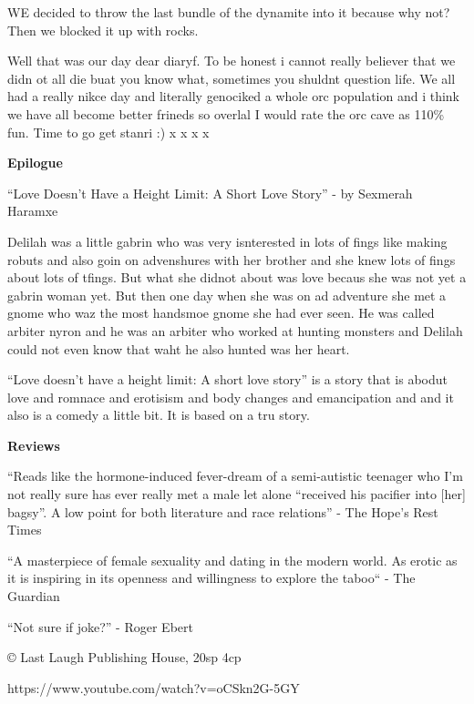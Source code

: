 WE decided to throw the last bundle of the dynamite into it because why not? Then we blocked it up with rocks.\medskip

Well that was our day dear diaryf. To be honest i cannot really believer that we didn ot all die buat you know what, sometimes you shuldnt question life. We all had a really nikce day and literally genociked a whole orc population and i think we have all become better frineds so overlal I would rate the orc cave as 110\% fun. Time to go get stanri :) x x x x\medskip

\textbf{Epilogue}\medskip

“Love Doesn’t Have a Height Limit: A Short Love Story” - by Sexmerah Haramxe\medskip

Delilah was a little gabrin who was very isnterested in lots of fings like making robuts and also goin on advenshures with her brother and she knew lots of fings about lots of tfings. But what she didnot about was love becaus she was not yet a gabrin woman yet. But then one day when she was on ad adventure she met a gnome who waz the most handsmoe gnome she had ever seen. He was called arbiter nyron and he was an arbiter who worked at hunting monsters and Delilah could not even know that waht he also hunted was her heart.\medskip

“Love doesn’t have a height limit: A short love story” is a story that is abodut love and romnace and erotisism and body changes and emancipation and and it also is a comedy a little bit. It is based on a tru story.\medskip

\textbf{Reviews}\medskip

“Reads like the hormone-induced fever-dream of a semi-autistic teenager who I’m not really sure has ever really met a male let alone “received his pacifier into [her] bagsy”. A low point for both literature and race relations” - The Hope’s Rest Times\medskip

“A masterpiece of female sexuality and dating in the modern world. As erotic as it is inspiring in its openness and willingness to explore the taboo“ - The Guardian\medskip

“Not sure if joke?” - Roger Ebert\medskip

© Last Laugh Publishing House, 20sp 4cp\medskip

https://www.youtube.com/watch?v=oCSkn2G-5GY





\vspace*{5mm}

